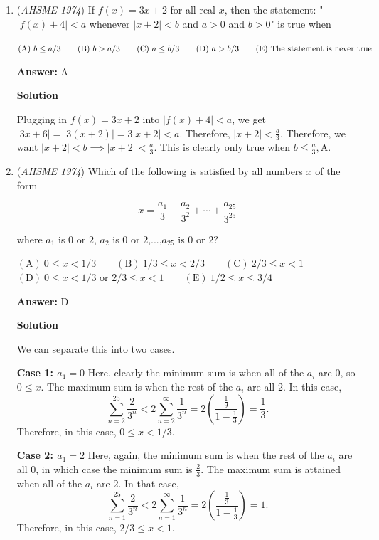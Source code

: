 \begin{enumerate}
 
soln by RNVAA

 


	\item (\textit{AHSME 1974}) If $f(x)=3x+2$ for all real $x$, then the statement:
"$|f(x)+4|<a$ whenever $|x+2|<b$ and $a>0$ and $b>0$"
is true when


 $\mathrm{(A)}\ b\le a/3\qquad\mathrm{(B)}\ b > a/3\qquad\mathrm{(C)}\ a\le b/3\qquad\mathrm{(D)}\ a > b/3\\ \qquad\mathrm{(E)}\ \text{The statement is never true.}$

 \textbf{Answer: }A



\textbf{Solution}

Plugging in $f(x)=3x+2$ into $|f(x)+4|<a$, we get $|3x+6|=|3(x+2)|=3|x+2|<a$. Therefore, $|x+2|<\frac{a}{3}$. Therefore, we want $|x+2|<b\implies |x+2|<\frac{a}{3}$. This is clearly only true when $b\le\frac{a}{3}, \boxed{\text{A}}$.

 


	\item (\textit{AHSME 1974}) Which of the following is satisfied by all numbers $x$ of the form


 
 \[x=\frac{a_1}{3}+\frac{a_2}{3^2}+\cdots+\frac{a_{25}}{3^{25}}\]


 where $a_1$ is $0$ or $2$, $a_2$ is $0$ or $2$,...,$a_{25}$ is $0$ or $2$?


 $\mathrm{(A)\ } 0\le x<1/3 \qquad \mathrm{(B) \ } 1/3\le x<2/3 \qquad \mathrm{(C) \  } 2/3\le x<1 \qquad$
$\mathrm{(D) \  } 0\le x<1/3 \text{ or }2/3\le x<1 \qquad \mathrm{(E) \  }1/2\le x\le 3/4$

 \textbf{Answer: }D



\textbf{Solution}

We can separate this into two cases.

 \textbf{Case 1: $a_1=0$} Here, clearly the minimum sum is when all of the $a_i$ are $0$, so $0\le x$. The maximum sum is when the rest of the $a_i$ are all $2$. In this case, 
 \[\sum_{n=2}^{25}\frac{2}{3^n}<2\sum_{n=2}^{\infty}\frac{1}{3^n}=2\left(\frac{\frac{1}{9}}{1-\frac{1}{3}}\right)=\frac{1}{3}.\] Therefore, in this case, $0\le x<1/3$.

 
\textbf{Case 2: $a_1=2$} Here, again, the minimum sum is when the rest of the $a_i$ are all $0$, in which case the minimum sum is $\frac{2}{3}$. The maximum sum is attained when all of the $a_i$ are $2$. In that case, 
 \[\sum_{n=1}^{25}\frac{2}{3^n}<2\sum_{n=1}^{\infty}\frac{1}{3^n}=2\left(\frac{\frac{1}{3}}{1-\frac{1}{3}}\right)=1.\] Therefore, in this case, $2/3\le x<1$.


\end{enumerate}
